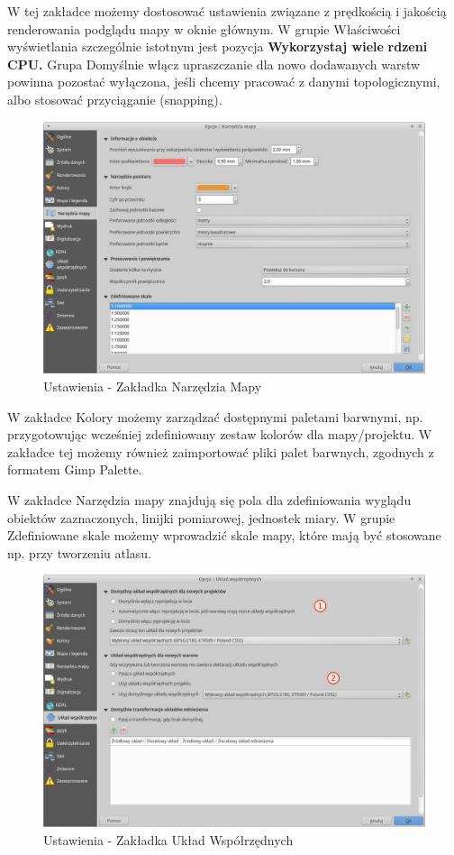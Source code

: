 \documentclass[12pt,a4paper]{book}
\begin{document}
W tej zakładce możemy dostosować ustawienia związane z prędkością i jakością renderowania podglądu mapy w oknie głównym. W grupie Właściwości wyświetlania szczególnie istotnym jest pozycja \textbf{Wykorzystaj wiele} \textbf{rdzeni CPU.} Grupa Domyślnie włącz upraszczanie dla nowo dodawanych warstw powinna pozostać wyłączona, jeśli chcemy pracować z danymi topologicznymi, albo stosować przyciąganie (snapping).
\begin{figure}[!ht]
	\centering
	\includegraphics[scale=0.4]{002-zakladka-narzedzia.jpg}
	\caption{Ustawienia - Zakładka Narzędzia Mapy}
\end{figure}

W zakładce Kolory możemy zarządzać dostępnymi paletami barwnymi, np. przygotowując wcześniej zdefiniowany zestaw kolorów dla mapy/projektu. W zakładce tej możemy również zaimportować pliki palet barwnych, zgodnych z formatem Gimp Palette.

W zakładce Narzędzia mapy znajdują się pola dla zdefiniowania wyglądu obiektów zaznaczonych, linijki pomiarowej, jednostek miary. W grupie Zdefiniowane skale możemy wprowadzić skale mapy, które mają być stosowane np. przy tworzeniu atlasu.
\begin{figure}[ht]
	\centering
	\includegraphics[scale=0.4]{002-zakladka-uklad.jpg}
	\caption{Ustawienia - Zakładka Układ Współrzędnych}
\end{figure}
\end{document}
